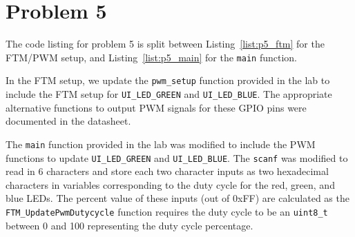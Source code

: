 \section*{Problem 5}
The code listing for problem 5 is split between Listing~\ref{list:p5_ftm} for the FTM/PWM setup, and Listing~\ref{list:p5_main} for the \texttt{main} function.

In the FTM setup, we update the \texttt{pwm\_setup} function provided in the lab to include the FTM setup for \texttt{UI\_LED\_GREEN} and \texttt{UI\_LED\_BLUE}. The appropriate alternative functions to output PWM signals for these GPIO pins were documented in the datasheet.


The \texttt{main} function provided in the lab was modified to include the PWM functions to update \texttt{UI\_LED\_GREEN} and \texttt{UI\_LED\_BLUE}. The \texttt{scanf} was modified to read in 6 characters and store each two character inputs as two hexadecimal characters in variables corresponding to the duty cycle for the red, green, and blue LEDs. The percent value of these inputs (out of 0xFF) are calculated as the \texttt{FTM\_UpdatePwmDutycycle} function requires the duty cycle to be an \texttt{uint8\_t} between 0 and 100 representing the duty cycle percentage.
